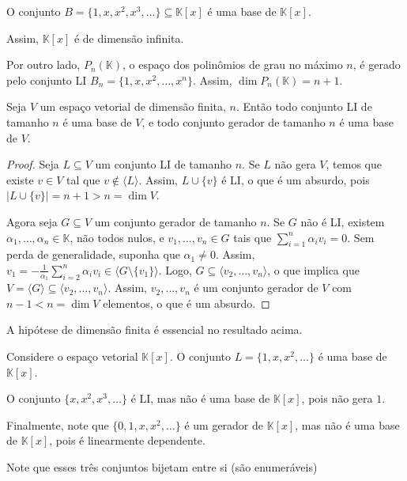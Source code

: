 \begin{example}
    O conjunto $B=\{1, x, x^2, x^3, \ldots\} \subseteq \mathbb K[x]$ é uma base de $\mathbb K[x]$.

    Assim, $\mathbb K[x]$ é de dimensão infinita.

    Por outro lado, $P_n(\mathbb K)$, o espaço dos polinômios de grau no máximo $n$, é gerado pelo conjunto LI $B_n=\{1, x, x^2, \ldots, x^n\}$.
    Assim, $\dim P_n(\mathbb K) = n+1$.
\end{example}

\begin{proposition}
Seja $V$ um espaço vetorial de dimensão finita, $n$.
Então todo conjunto LI de tamanho $n$ é uma base de $V$, e todo conjunto gerador de tamanho $n$ é uma base de $V$.
\end{proposition}
\begin{proof}
    Seja $L \subseteq V$ um conjunto LI de tamanho $n$.
    Se $L$ não gera $V$, temos que existe $v \in V$ tal que $v \notin \langle L \rangle$.
    Assim, $L \cup \{v\}$ é LI, o que é um absurdo, pois $|L \cup \{v\}| = n+1 > n = \dim V$.

    Agora seja $G\subseteq V$ um conjunto gerador de tamanho $n$.
    Se $G$ não é LI, existem $\alpha_1, \ldots, \alpha_n \in \mathbb K$, não todos nulos, e $v_1, \ldots, v_n \in G$ tais que $\sum_{i=1}^n \alpha_i v_i = 0$.
    Sem perda de generalidade, suponha que $\alpha_1 \neq 0$.
    Assim, $v_1 = -\frac{1}{\alpha_1} \sum_{i=2}^n \alpha_i v_i \in \langle G\setminus\{v_1\}\rangle$.
    Logo, $G \subseteq \langle v_2, \ldots, v_n \rangle$, o que implica que $V = \langle G \rangle \subseteq \langle v_2, \ldots, v_n \rangle$.
    Assim, $v_2, \ldots, v_n$ é um conjunto gerador de $V$ com $n-1 < n = \dim V$ elementos, o que é um absurdo.
\end{proof}

A hipótese de dimensão finita é essencial no resultado acima.
\begin{example}
    Considere o espaço vetorial $\mathbb K[x]$.
    O conjunto $L=\{1, x, x^2, \ldots\}$ é uma base de $\mathbb K[x]$.

    O conjunto $\{x, x^2, x^3, \ldots\}$ é LI, mas não é uma base de $\mathbb K[x]$, pois não gera $1$.

    Finalmente, note que $\{0, 1, x, x^2, \ldots\}$ é um gerador de $\mathbb K[x]$, mas não é uma base de $\mathbb K[x]$, pois é linearmente dependente.

    Note que esses três conjuntos bijetam entre si (são enumeráveis)
\end{example}

